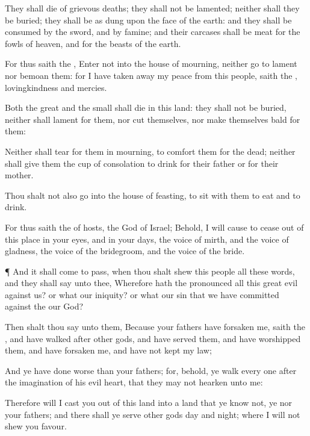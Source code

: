 {They shall
die of
grievous
deaths; they shall not be
lamented; neither shall they be
buried;
{} they shall be as
dung upon the
face of the
earth: and they shall be
consumed by the
sword, and by
famine; and their
carcases shall be
meat for the
fowls of
heaven, and for the
beasts of the
earth.

For thus
saith the
{},
Enter not into the
house of
mourning, neither
go to
lament nor
bemoan them: for I have taken
away my
peace from this
people,
saith the
{},
{}
lovingkindness and
mercies.

Both the
great and the
small shall
die in this
land: they shall not be
buried, neither shall
{}
lament for them, nor
cut themselves, nor make themselves
bald for them:

Neither shall
{}
tear
{} for them in
mourning, to
comfort them for the
dead; neither shall
{} give them the
cup of
consolation to
drink for their
father or for their
mother.

Thou shalt not also
go into the
house of
feasting, to
sit with them to
eat and to
drink.

For thus
saith the
{} of
hosts, the
God of
Israel; Behold, I will cause to
cease out of this
place in your
eyes, and in your
days, the
voice of
mirth, and the
voice of
gladness, the
voice of the
bridegroom, and the
voice of the
bride.


\par }{\PP {}¶ And it shall come to pass, when thou shalt
shew this
people all these
words, and they shall
say unto thee, Wherefore hath the
{}
pronounced all this
great
evil against us? or what
{} our
iniquity? or what
{} our
sin that we have
committed against the
{} our
God?

Then shalt thou
say unto them, Because your
fathers have
forsaken me,
saith the
{}, and have
walked
after
other
gods, and have
served them, and have
worshipped them, and have
forsaken me, and have not
kept my
law;

And ye have
done
worse than your
fathers; for,
behold, ye
walk every
one
after the
imagination of his
evil
heart, that they may not
hearken unto me:

Therefore will I
cast you out of this
land into a
land that ye
know not,
{} ye nor your
fathers; and there shall ye
serve
other
gods
day and
night; where I will not
shew you
favour.


}
